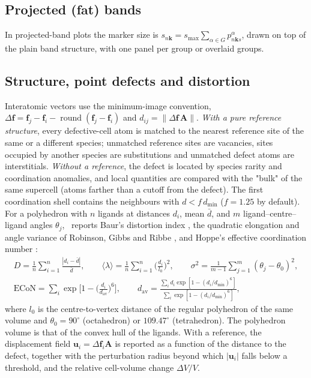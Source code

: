 \subsection{Projected (fat) bands}
In projected-band plots the marker size is $s_{n\bm{k}}=s_\mathrm{max}\sum_{\alpha\in G}p^{\alpha}_{n\bm{k} s}$, drawn on top of the plain band structure, with one panel per group or overlaid groups.

\subsection{Structure, point defects and distortion}
Interatomic vectors use the minimum-image convention, $\Delta\mathbf f=\mathbf f_j-\mathbf f_i-\operatorname{round}(\mathbf f_j-\mathbf f_i)$ and $d_{ij}=\lVert\Delta\mathbf f\,\mathbf A\rVert$. \emph{With a pure reference structure}, every defective-cell atom is matched to the nearest reference site of the same or a different species; unmatched reference sites are vacancies, sites occupied by another species are substitutions and unmatched defect atoms are interstitials. \emph{Without a reference}, the defect is located by species rarity and coordination anomalies, and local quantities are compared with the "bulk" of the same supercell (atoms farther than a cutoff from the defect). The first coordination shell contains the neighbours with $d<f\,d_\mathrm{min}$ ($f=1.25$ by default). For a polyhedron with $n$ ligands at distances $d_i$, mean $\bar d$, and $m$ ligand–centre–ligand angles $\theta_j$, \BMR\ reports Baur's distortion index \cite{baur1974}, the quadratic elongation and angle variance of Robinson, Gibbs and Ribbe \cite{robinson1971}, and Hoppe's effective coordination number \cite{hoppe1979}:
\begin{gather}
D=\frac1n\sum_{i=1}^{n}\frac{|d_i-\bar d|}{\bar d},\qquad
\langle\lambda\rangle=\frac1n\sum_{i=1}^{n}\Big(\frac{d_i}{l_0}\Big)^2,\qquad
\sigma^2=\frac{1}{m-1}\sum_{j=1}^{m}(\theta_j-\theta_0)^2,\\
\mathrm{ECoN}=\sum_{i}\exp\!\Big[1-\Big(\frac{d_i}{d_\mathrm{av}}\Big)^6\Big],\qquad
d_\mathrm{av}=\frac{\sum_i d_i\exp[1-(d_i/d_\mathrm{min})^6]}{\sum_i\exp[1-(d_i/d_\mathrm{min})^6]},
\end{gather}
where $l_0$ is the centre-to-vertex distance of the regular polyhedron of the same volume and $\theta_0=90^\circ$ (octahedron) or $109.47^\circ$ (tetrahedron). The polyhedron volume is that of the convex hull of the ligands. With a reference, the displacement field $\mathbf u_i=\Delta\mathbf f_i\mathbf A$ is reported as a function of the distance to the defect, together with the perturbation radius beyond which $|\mathbf u_i|$ falls below a threshold, and the relative cell-volume change $\Delta V/V$.

